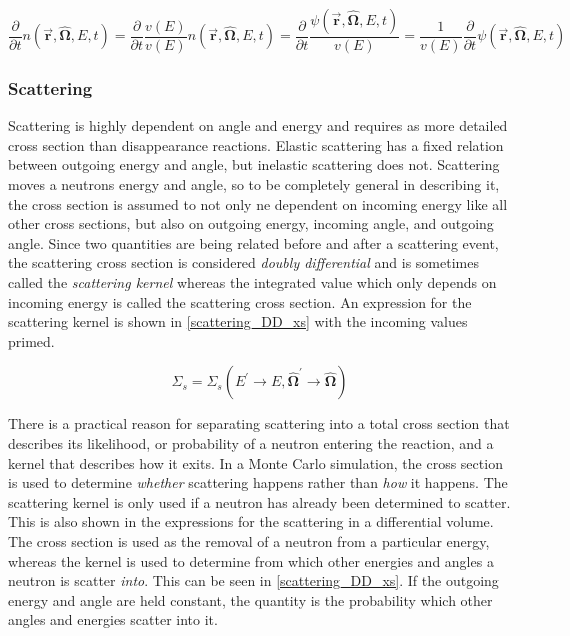 \begin{equation}
\label{time_depedent_flux}
\frac{\partial }{\partial t}n(\boldsymbol{\vec{r}},\boldsymbol{\hat{\Omega}},E,t) = \frac{\partial }{\partial t}  \frac{v(E)}{v(E)} n(\boldsymbol{\vec{r}},\boldsymbol{\hat{\Omega}},E,t) =  \frac{\partial }{\partial t}  \frac{\psi(\boldsymbol{\vec{r}},\boldsymbol{\hat{\Omega}},E,t)}{v(E)} = \frac{1}{v(E)} \frac{\partial }{\partial t}\psi(\boldsymbol{\vec{r}},\boldsymbol{\hat{\Omega}},E,t)
\end{equation}

\subsubsection{Scattering}

Scattering is highly dependent on angle and energy and requires as more detailed cross section than disappearance reactions.  Elastic scattering has a fixed relation between outgoing energy and angle, but inelastic scattering does not.  Scattering moves a neutrons energy and angle, so to be completely general in describing it, the cross section is assumed to not only ne dependent on incoming energy like all other cross sections, but also on outgoing energy, incoming angle, and outgoing angle.  Since two quantities are being related before and after a scattering event, the scattering cross section is considered \emph{doubly differential} and is sometimes called the \emph{scattering kernel} whereas the integrated value which only depends on incoming energy is called the scattering cross section.   An expression for the scattering kernel is shown in \eqref{scattering_DD_xs} with the incoming values primed.

\begin{equation}
\label{scattering_DD_xs}
\Sigma_s = \Sigma_s(E^\prime \rightarrow E,\boldsymbol{\hat{\Omega}}^\prime \rightarrow \boldsymbol{\hat{\Omega}})
 \end{equation}

There is a practical reason for separating scattering into a total cross section that describes its likelihood, or probability of a neutron entering the reaction, and a kernel that describes how it exits.  In a Monte Carlo simulation, the cross section is used to determine \emph{whether} scattering happens rather than \emph{how} it happens.  The scattering kernel is only used if a neutron has already been determined to scatter.  This is also shown in the expressions for the scattering in a differential volume.  The cross section is used as the removal of a neutron from a particular energy, whereas the kernel is used to determine from which other energies and angles a neutron is scatter \emph{into}.  This can be seen in \eqref{scattering_DD_xs}.  If the outgoing energy and angle are held constant, the quantity is the probability which other angles and energies scatter into it.

